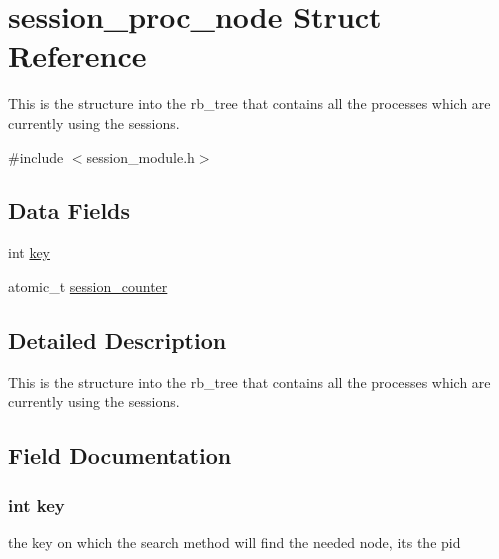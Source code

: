 \hypertarget{structsession__proc__node}{}\section{session\+\_\+proc\+\_\+node Struct Reference}
\label{structsession__proc__node}


This is the structure into the rb\+\_\+tree that contains all the processes which are currently using the sessions.  




{\ttfamily \#include $<$session\+\_\+module.\+h$>$}

\subsection*{Data Fields}
\begin{DoxyCompactItemize}
\item 
int \hyperlink{structsession__proc__node_a35af0be900467fedbb610bd6ea65ed78}{key}
\item 
atomic\+\_\+t \hyperlink{structsession__proc__node_a4044530856f9298fceb80cb98e0cc890}{session\+\_\+counter}
\end{DoxyCompactItemize}


\subsection{Detailed Description}
This is the structure into the rb\+\_\+tree that contains all the processes which are currently using the sessions. 

\subsection{Field Documentation}
\subsubsection[{\texorpdfstring{key}{key}}]{\setlength{\rightskip}{0pt plus 5cm}int key}\hypertarget{structsession__proc__node_a35af0be900467fedbb610bd6ea65ed78}{}\label{structsession__proc__node_a35af0be900467fedbb610bd6ea65ed78}
the key on which the search method will find the needed node, its the pid 
